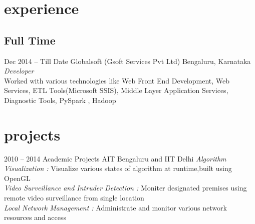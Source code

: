 \documentclass[]{friggeri-cv} %
\begin{document}

\section{experience}

\subsection{Full Time}

\begin{entrylist}


\entry
{Dec 2014 -- Till Date }
{Globalsoft {\normalfont(Gsoft Services Pvt Ltd)}}
{Bengaluru, Karnataka}
{\emph{Developer} \\
Worked with various technologies like Web Front End Development, Web Services, 
ETL Tools(Microsoft SSIS), Middle Layer Application Services, Diagnostic Tools, 
PySpark , Hadoop }

\end{entrylist}



\section{projects}

\begin{entrylist}

\entry
{2010 -- 2014}
{Academic Projects}
{AIT Bengaluru and IIT Delhi}
{\emph{Algorithm Visualization :}
Visualize various states of algorithm at runtime,built using OpenGL\\

\emph{Video Surveillance and Intruder Detection :}
Moniter designated premises using remote video surveillance from single location\\

\emph{Local Network Management :}
Administrate and monitor various network resources and access}
\end{entrylist}
\end{document}
